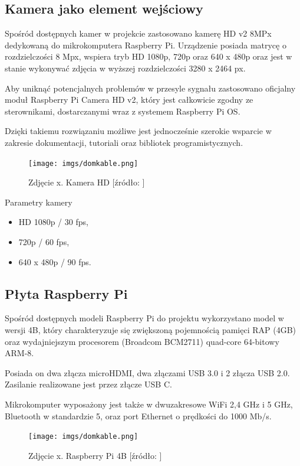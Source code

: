 \documentclass[a4paper,12pt,reqno]{article}
\begin{document}
\subsection{Kamera jako element wejściowy}

Spośród dostępnych kamer w projekcie zastosowano kamerę  HD v2 8MPx dedykowaną do mikrokomputera Raspberry Pi. Urządzenie posiada matrycę o rozdzielczości 8 Mpx, wspiera tryb HD 1080p, 720p oraz 640 x 480p oraz jest w stanie wykonywać zdjęcia w wyższej rozdzielczości 3280 x 2464 px.

Aby uniknąć potencjalnych problemów w przesyle sygnału zastosowano oficjalny moduł Raspberry Pi Camera HD v2, który jest całkowicie zgodny ze sterownikami, dostarczanymi wraz z systemem Raspberry Pi OS.

Dzięki takiemu rozwiązaniu możliwe jest jednocześnie szerokie wsparcie w zakresie dokumentacji, tutoriali oraz bibliotek programistycznych.

\begin{figure}[!ht]%
\centering
\texttt{[image: imgs/domkable.png]}
\caption{Zdjęcie x. Kamera HD [źródło: ] \label{kamera}}
\quad
\end{figure}

Parametry kamery

\begin{itemize}
	\item HD 1080p / 30 fps,
	\item 720p / 60 fps,
	\item 640 x 480p / 90 fps.
\end{itemize}

\subsection{Płyta Raspberry Pi}

Spośród dostępnych modeli Raspberry Pi do projektu wykorzystano model w wersji 4B, który charakteryzuje się zwiększoną pojemnością pamięci RAP (4GB) oraz wydajniejszym procesorem (Broadcom BCM2711) quad-core 64-bitowy ARM-8.

Posiada on dwa złącza microHDMI, dwa złączami USB 3.0 i 2 złącza USB 2.0. Zasilanie realizowane jest przez złącze USB C.

Mikrokomputer wyposażony jest także w dwuzakresowe WiFi 2,4 GHz i 5 GHz, Bluetooth w standardzie 5, oraz port Ethernet o prędkości do 1000 Mb/s.

\begin{figure}[!ht]%
\centering
\texttt{[image: imgs/domkable.png]}
\caption{Zdjęcie x. Raspberry Pi 4B [źródło: ] \label{rp4b}}
\quad
\end{figure}
\end{document}
